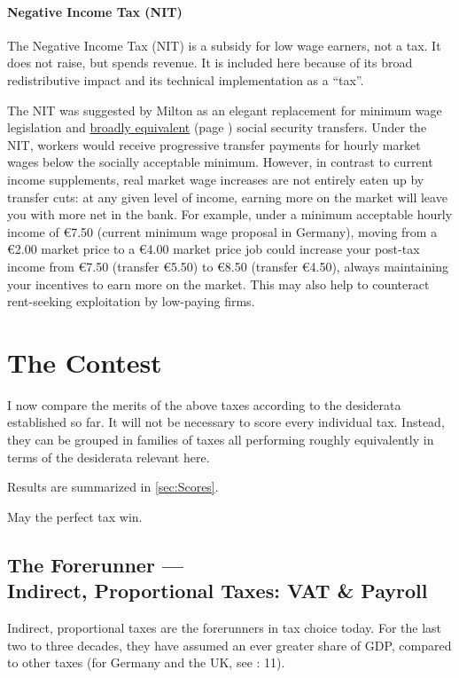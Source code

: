 \paragraph{Negative Income Tax (NIT)}  \label{sec:NIT} The Negative Income Tax (NIT) is a subsidy for low wage earners, not a tax. It does not raise, but spends revenue. It is included here because of its broad redistributive impact and its technical implementation as a ``tax''. 

The NIT was suggested by Milton \cite{Friedman1962} as an elegant replacement for minimum wage legislation and \hyperref[sec:StructuralUnemployment]{broadly equivalent} (page \pageref{sec:StructuralUnemployment}) social security transfers. Under the NIT, workers would receive progressive transfer payments for hourly market wages below the socially acceptable minimum. However, in contrast to current income supplements, real market wage increases are not entirely eaten up by transfer cuts: at any given level of income, earning more on the market will leave you with more net in the bank. For example, under a minimum acceptable hourly income of \euro{}7.50 (current minimum wage proposal in Germany), moving from a \euro{}2.00 market price to a \euro{}4.00 market price job could increase your post-tax income from \euro{}7.50 (transfer \euro{}5.50) to \euro{}8.50 (transfer \euro{}4.50), always maintaining your incentives to earn more on the market. This may also help to counteract rent-seeking exploitation by low-paying firms.

\section{The Contest} \label{sec:contest} I now compare the merits of the above taxes according to the desiderata established so far. It will not be necessary to score every individual tax. Instead, they can be grouped in families of taxes all performing roughly equivalently in terms of the desiderata relevant here.

Results are summarized in \autoref{sec:Scores}.

May the perfect tax win.

\subsection[Indirect, Proportional Taxes]{The Forerunner ---\\Indirect, Proportional Taxes: VAT \& Payroll} \label{sec:ScoreVAT} Indirect, proportional taxes are the forerunners in tax choice today. For the last two to three decades, they have assumed an ever greater share of GDP, compared to other taxes (for Germany and the UK, see \citealt{Kemmerling2009}: 11). 

